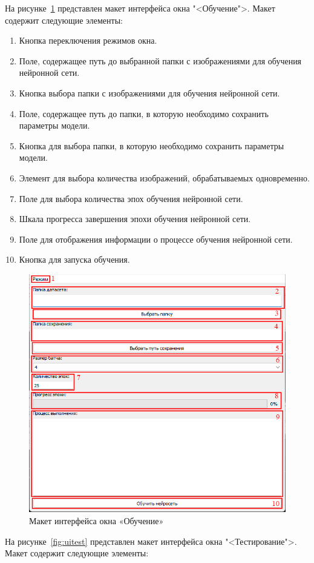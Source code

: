 На рисунке~\ref{fig:uitrain} представлен макет интерфейса окна "<Обучение">. Макет содержит следующие элементы:

\begin{enumerate}
	\item Кнопка переключения режимов окна.
	\item Поле, содержащее путь до выбранной папки с изображениями для обучения нейронной сети.
	\item Кнопка выбора папки с изображениями для обучения нейронной сети.
	\item Поле, содержащее путь до папки, в которую необходимо сохранить параметры модели.
	\item Кнопка для выбора папки, в которую необходимо сохранить параметры модели.
	\item Элемент для выбора количества изображений, обрабатываемых одновременно.
	\item Поле для выбора количества эпох обучения нейронной сети.
	\item Шкала прогресса завершения эпохи обучения нейронной сети.
	\item Поле для отображения информации о процессе обучения нейронной сети.
	\item Кнопка для запуска обучения.
\end{enumerate}

\begin{figure}[H]
	\centering
	\includegraphics[width=0.7\linewidth]{images/ui_train}
	\caption{Макет интерфейса окна «Обучение»}
	\label{fig:uitrain}
\end{figure}

На рисунке~\ref{fig:uitest} представлен макет интерфейса окна "<Тестирование">. Макет содержит следующие элементы:

